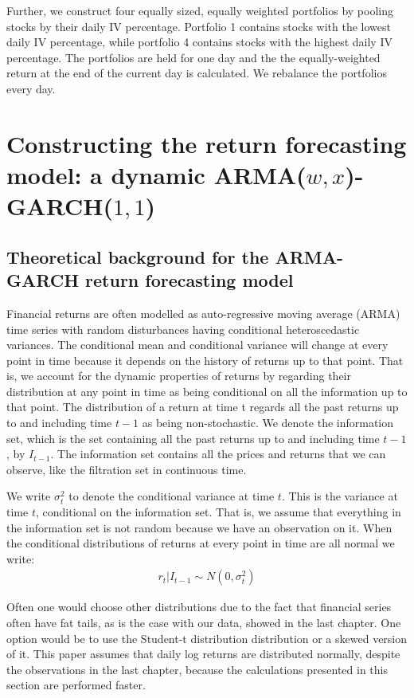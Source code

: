 Further, we construct four equally sized, equally weighted portfolios by pooling stocks by their daily IV percentage. Portfolio 1 contains stocks with the lowest daily IV percentage, while portfolio 4 contains stocks with the highest daily IV percentage. The portfolios are held for one day and the the equally-weighted return at the end of the current day is calculated. We rebalance the portfolios every day. 


\section{Constructing the return forecasting model: a dynamic ARMA($w,x$)-GARCH($1,1$)} 


\subsection{Theoretical background for the ARMA-GARCH return forecasting model}

Financial returns are often modelled as auto-regressive moving average (ARMA) time series with random disturbances having conditional heteroscedastic variances. The conditional mean and conditional variance will change at every point in time because it depends on the history of returns up to that point. That is, we account for the dynamic properties of returns by regarding their distribution at any point in time as being conditional on all the information up to that point. The distribution of a return at time t regards all the past returns up to and including time $t-1$ as being non-stochastic. We denote the information set, which is the set containing all the past returns up to and including time $t-1$, by $I_{t-1}$. The information set contains all the prices and returns that we can observe, like the filtration set in continuous time. 

We write $\sigma_t^2$ to denote the conditional variance at time $t$. This is the variance at time $t$, conditional on the information set. That is, we assume that everything in the information set is not random because we have an observation on it. When the conditional distributions of returns at every point in time are all normal we write:
\begin{align}
    r_t | I_{t-1} \sim N(0,{\sigma_t^2})
\end{align}

Often one would choose other distributions due to the fact that financial series often have fat tails, as is the case with our data, showed in the last chapter. One option would be to use the Student-t distribution distribution or a skewed version of it. This paper assumes that daily log returns are distributed normally, despite the observations in the last chapter, because the calculations presented in this section are performed faster.

